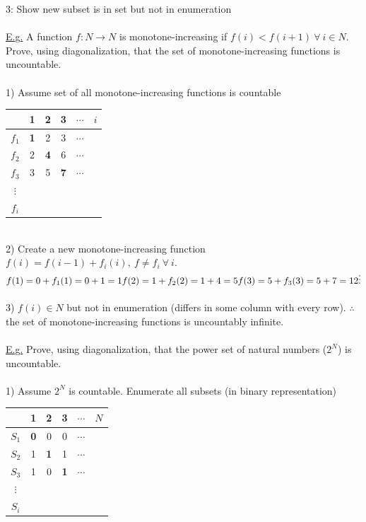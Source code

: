 \documentclass[8pt,letterpaper,twocolumn]{article}
\begin{document}
3: Show new subset is in set but not in enumeration\\
\\
\underline{E.g.} A function $f : N \rightarrow N$ is monotone-increasing if
$f(i) < f(i+1) \: \forall \: i \in N$.
Prove, using diagonalization, that the set of monotone-increasing functions is uncountable.\\
\\
1) Assume set of all monotone-increasing functions is countable
\begin{tabular}{c|c c c c c}
& 1 & 2 & 3 & $\cdots$ & $i$ \\
\hline
$f_1$ & \textbf{1} & 2 & 3 & $\cdots$\\
$f_2$ & 2 & \textbf{4} & 6 & $\cdots$\\
$f_3$ & 3 & 5 & \textbf{7} & $\cdots$\\
$\vdots$\\
$f_i$\\
\end{tabular}
\\
2) Create a new monotone-increasing function $f(i) = f(i-1) + f_i(i),\: f \neq f_i \: \forall \: i$.\\
$f(1) = 0 + f_1(1) = 0 + 1 = 1\\
f(2) = 1 + f_2(2) = 1 + 4 = 5\\
f(3) = 5 + f_3(3) = 5 + 7 = 12\\
\vdots$\\
\\
3) $f(i) \in N$ but not in enumeration (differs in some column with every row).
$\therefore$ the set of monotone-increasing functions is uncountably infinite.\\
\\
\underline{E.g.} Prove, using diagonalization, that the power set of natural numbers ($2^N$) is uncountable.\\
\\
1) Assume $2^N$ is countable. Enumerate all subsets (in binary representation)
\begin{tabular}{c|c c c c c}
& 1 & 2 & 3 & $\cdots$ & $N$ \\
\hline
$S_1$ & \textbf{0} & 0 & 0 & $\cdots$\\
$S_2$ & 1 & \textbf{1} & 1 & $\cdots$\\
$S_3$ & 1 & 0 & \textbf{1} & $\cdots$\\
$\vdots$\\
$S_i$\\
\end{tabular}\\
\end{document}
